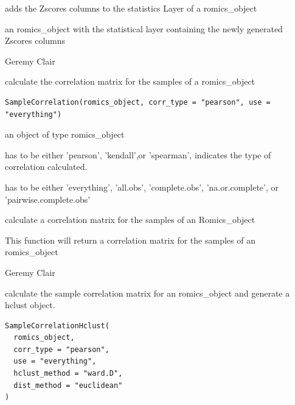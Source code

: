 \documentclass[a4paper]{book}
\begin{document}
%
\begin{Details}
adds the Zscores columns to the statistics Layer of a romics\_object
\end{Details}
%
\begin{Value}
an romics\_object with the statistical layer containing the newly generated Zscores columns
\end{Value}
%
\begin{Author}
Geremy Clair
\end{Author}
%
\begin{Description}
calculate the correlation matrix for the samples of a romics\_object
\end{Description}
%
\begin{Usage}
\begin{verbatim}
SampleCorrelation(romics_object, corr_type = "pearson", use = "everything")
\end{verbatim}
\end{Usage}
%
\begin{Arguments}
\begin{ldescription}
\item[\code{romics\_object}] an object of type romics\_object

\item[\code{corr\_type}] has to be either 'pearson', 'kendall',or 'spearman', indicates the type of correlation calculated.

\item[\code{use}] has to be either 'everything', 'all.obs', 'complete.obs', 'na.or.complete', or 'pairwise.complete.obs'
\end{ldescription}
\end{Arguments}
%
\begin{Details}
calculate a correlation matrix for the samples of an Romics\_object
\end{Details}
%
\begin{Value}
This function will return a correlation matrix for the samples of an romics\_object
\end{Value}
%
\begin{Author}
Geremy Clair
\end{Author}
%
\begin{Description}
calculate the sample correlation matrix for an romics\_object and generate a hclust object.
\end{Description}
%
\begin{Usage}
\begin{verbatim}
SampleCorrelationHclust(
  romics_object,
  corr_type = "pearson",
  use = "everything",
  hclust_method = "ward.D",
  dist_method = "euclidean"
)
\end{verbatim}
\end{Usage}
\end{document}
